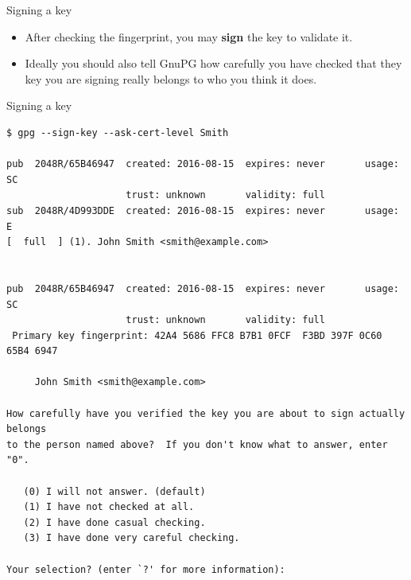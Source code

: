 \documentclass[
mode=present,
paper=smartboard,
size=20pt,
]{powerdot}
\begin{document}
\begin{slide}[method=direct]{Signing a key}
  \begin{itemize}
  \item After checking the fingerprint, you may \textbf{sign} the key
    to validate it.
  \item Ideally you should also tell GnuPG how carefully you have
    checked that they key you are signing really belongs to who you
    think it does.
  \end{itemize}
\end{slide}

\makeatletter\renewcommand{\verbatim@font}{\scriptsize\tt}\makeatother
\begin{slide}[method=direct,toc=]{Signing a key}
\begin{verbatim}
$ gpg --sign-key --ask-cert-level Smith

pub  2048R/65B46947  created: 2016-08-15  expires: never       usage: SC  
                     trust: unknown       validity: full
sub  2048R/4D993DDE  created: 2016-08-15  expires: never       usage: E   
[  full  ] (1). John Smith <smith@example.com>


pub  2048R/65B46947  created: 2016-08-15  expires: never       usage: SC  
                     trust: unknown       validity: full
 Primary key fingerprint: 42A4 5686 FFC8 B7B1 0FCF  F3BD 397F 0C60 65B4 6947

     John Smith <smith@example.com>

How carefully have you verified the key you are about to sign actually belongs
to the person named above?  If you don't know what to answer, enter "0".

   (0) I will not answer. (default)
   (1) I have not checked at all.
   (2) I have done casual checking.
   (3) I have done very careful checking.

Your selection? (enter `?' for more information):
\end{verbatim}
\end{slide}
\end{document}
